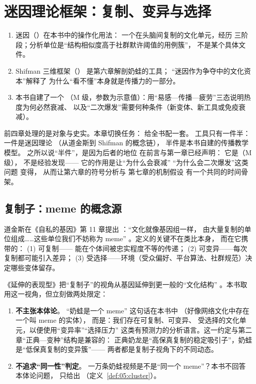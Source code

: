 \chapter{迷因理论框架：复制、变异与选择}\label{ch:05}

\begin{nlkeypoints}
  \begin{enumerate}[label=(\arabic*),leftmargin=2.4em]
    \item 迷因（）在本书中的操作化用法：
          一个在头脑间复制的文化单元，经历
          三阶段；分析单位是“结构相似度高于社群默许阈值的用例簇”，
          不是某个具体文件。
    \item Shifman 三维框架（）
          是第六章解剖奶蛙的工具；
          “迷因作为争夺中的文化资本”解释了
          为什么“看不懂”本身就是传播力的一部分。
    \item 本书自建了一个
（M 级，参数为示意值）：用“易感—传播—疲劳”三态说明热度为何必然衰减、
以及“二次爆发”需要何种条件（新变体、新工具或免疫衰减）。
  \end{enumerate}
\end{nlkeypoints}

前四章处理的是对象与史实。本章切换任务：
给全书配一套。
工具只有一件半：一件是迷因理论
（从道金斯到 Shifman 的概念链），
半件是本书自建的传播教学模型。
之所以说“半件”，是因为后者的地位
在前言与第一章已经声明：
它是（M 级），
不是经验发现——
它的作用是让“为什么会衰减”
“为什么会二次爆发”这类问题
变得，
从而让第六章的符号分析与
第七章的机制假设
有一个共同的时间骨架。

\section{复制子：meme 的概念源}\label{sec:05:dawkins}

道金斯在《自私的基因》第 11 章提出 ：“文化就像基因组一样，
 由大量复制的单位组成……这些单位我们不妨称为 meme”
 \cite{dawkins1976selfish}。定义的关键不在类比本身，
 而在它携带的： (1) 可复制——
能在个体间被忠实程度不等的传递； (2) 可变异——每次复制都可能引入差异；
 (3) 受选择——环境（受众偏好、平台算法、社群规范）决定哪些变体留存。

《延伸的表现型》把“复制子”的视角从基因延伸到更一般的“文化结构”
\cite{dawkins1982extended}。本书取用这一视角，但立刻做两处限定：

\begin{enumerate}[label=\arabic*.]
  \item \textbf{不主张本体论}。
“奶蛙是一个 meme”
 这句话在本书中  （好像网络文化中存在一个叫 meme 的实体），
 而是：我们存在可复制、可变异、
受选择的文化单元，以便使用“变异率”“选择压力”
 这类有预测力的分析语言。这一约定与第二章“正典—变种”结构是兼容的：
 正典奶龙是“高保真复制的稳定吸引子”，奶蛙是“低保真复制的变异簇”——
 两者都是复制子视角下的不同动态。
  \item \textbf{不追求“同一性”判定}。
一万条奶蛙视频是不是“同一个 meme”？本书不回答本体论问题，
 只给出 （定义~\ref{def:05:cluster}）。
\end{enumerate}


